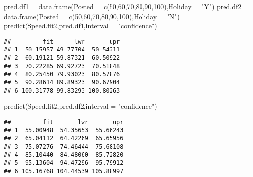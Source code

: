 \documentclass[
]{article}
\newenvironment{Shaded}{\begin{snugshade}}{\end{snugshade}}
\newcommand{\AttributeTok}[1]{\textcolor[rgb]{0.77,0.63,0.00}{#1}}
\newcommand{\DecValTok}[1]{\textcolor[rgb]{0.00,0.00,0.81}{#1}}
\newcommand{\FunctionTok}[1]{\textcolor[rgb]{0.00,0.00,0.00}{#1}}
\newcommand{\NormalTok}[1]{#1}
\newcommand{\OtherTok}[1]{\textcolor[rgb]{0.56,0.35,0.01}{#1}}
\newcommand{\StringTok}[1]{\textcolor[rgb]{0.31,0.60,0.02}{#1}}
\begin{document}
\begin{Shaded}
\begin{Highlighting}[]
\NormalTok{pred.df1 }\OtherTok{=} \FunctionTok{data.frame}\NormalTok{(}\AttributeTok{Posted =} \FunctionTok{c}\NormalTok{(}\DecValTok{50}\NormalTok{,}\DecValTok{60}\NormalTok{,}\DecValTok{70}\NormalTok{,}\DecValTok{80}\NormalTok{,}\DecValTok{90}\NormalTok{,}\DecValTok{100}\NormalTok{),}\AttributeTok{Holiday =} \StringTok{"Y"}\NormalTok{)}
\NormalTok{pred.df2 }\OtherTok{=} \FunctionTok{data.frame}\NormalTok{(}\AttributeTok{Posted =} \FunctionTok{c}\NormalTok{(}\DecValTok{50}\NormalTok{,}\DecValTok{60}\NormalTok{,}\DecValTok{70}\NormalTok{,}\DecValTok{80}\NormalTok{,}\DecValTok{90}\NormalTok{,}\DecValTok{100}\NormalTok{),}\AttributeTok{Holiday =} \StringTok{"N"}\NormalTok{)}
\FunctionTok{predict}\NormalTok{(Speed.fit2,pred.df1,}\AttributeTok{interval =} \StringTok{"confidence"}\NormalTok{)}
\end{Highlighting}
\end{Shaded}

\begin{verbatim}
##         fit      lwr       upr
## 1  50.15957 49.77704  50.54211
## 2  60.19121 59.87321  60.50922
## 3  70.22285 69.92723  70.51848
## 4  80.25450 79.93023  80.57876
## 5  90.28614 89.89323  90.67904
## 6 100.31778 99.83293 100.80263
\end{verbatim}

\begin{Shaded}
\begin{Highlighting}[]
\FunctionTok{predict}\NormalTok{(Speed.fit2,pred.df2,}\AttributeTok{interval =} \StringTok{"confidence"}\NormalTok{)}
\end{Highlighting}
\end{Shaded}

\begin{verbatim}
##         fit       lwr       upr
## 1  55.00948  54.35653  55.66243
## 2  65.04112  64.42269  65.65956
## 3  75.07276  74.46444  75.68108
## 4  85.10440  84.48060  85.72820
## 5  95.13604  94.47296  95.79912
## 6 105.16768 104.44539 105.88997
\end{verbatim}
\end{document}
